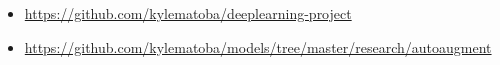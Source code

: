 \documentclass[10pt,twocolumn,letterpaper]{article}
\begin{document}
	\begin{itemize}
	\item \url{https://github.com/kylematoba/deeplearning-project}
	\item \url{https://github.com/kylematoba/models/tree/master/research/autoaugment}
	\end{itemize}


\nocite{Torralba2008}
{\small


}
\end{document}

